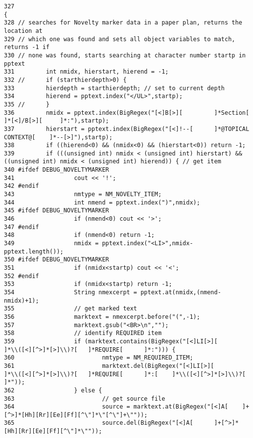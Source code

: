 \footnotesize\begin{verbatim}327                                                                                                    {
328 // searches for Novelty marker data in a paper plan, returns the location at
329 // which one was found and sets all object variables to match, returns -1 if
330 // none was found, starts searching at character number startp in pptext
331         int nmidx, hierstart, hierend = -1;
332 //      if (starthierdepth>0) {
333         hierdepth = starthierdepth; // set to current depth
334         hierend = pptext.index("</UL>",startp);
335 //      }
336         nmidx = pptext.index(BigRegex("[<]B[>][         ]*Section[      ]*[<]/B[>][     ]*:"),startp);
337         hierstart = pptext.index(BigRegex("[<]!--[      ]*@TOPICAL CONTEXT@[    ]*--[>]"),startp);
338         if ((hierend<0) && (nmidx<0) && (hierstart<0)) return -1;
339         if (((unsigned int) nmidx < (unsigned int) hierstart) && ((unsigned int) nmidx < (unsigned int) hierend)) { // get item
340 #ifdef DEBUG_NOVELTYMARKER
341                 cout << '!';
342 #endif
343                 nmtype = NM_NOVELTY_ITEM;
344                 int nmend = pptext.index(")",nmidx);
345 #ifdef DEBUG_NOVELTYMARKER
346                 if (nmend<0) cout << '>';
347 #endif
348                 if (nmend<0) return -1;
349                 nmidx = pptext.index("<LI>",nmidx-pptext.length());
350 #ifdef DEBUG_NOVELTYMARKER
351                 if (nmidx<startp) cout << '<';
352 #endif
353                 if (nmidx<startp) return -1;
354                 String nmexcerpt = pptext.at(nmidx,(nmend-nmidx)+1);
355                 // get marked text
356                 marktext = nmexcerpt.before("(",-1);
357                 marktext.gsub("<BR>\n","");
358                 // identify REQUIRED item
359                 if (marktext.contains(BigRegex("[<]LI[>][       ]*\\([<][^>]*[>]\\)?[   ]*REQUIRE[      ]*:"))) {
360                         nmtype = NM_REQUIRED_ITEM;
361                         marktext.del(BigRegex("[<]LI[>][        ]*\\([<][^>]*[>]\\)?[   ]*REQUIRE[      ]*:[    ]*\\([<][^>]*[>]\\)?[   ]*"));
362                 } else {
363                         // get source file
364                         source = marktext.at(BigRegex("[<]A[    ]+[^>]*[Hh][Rr][Ee][Ff][^\"]*\"[^\"]+\""));
365                         source.del(BigRegex("[<]A[      ]+[^>]*[Hh][Rr][Ee][Ff][^\"]*\""));

\end{verbatim}
